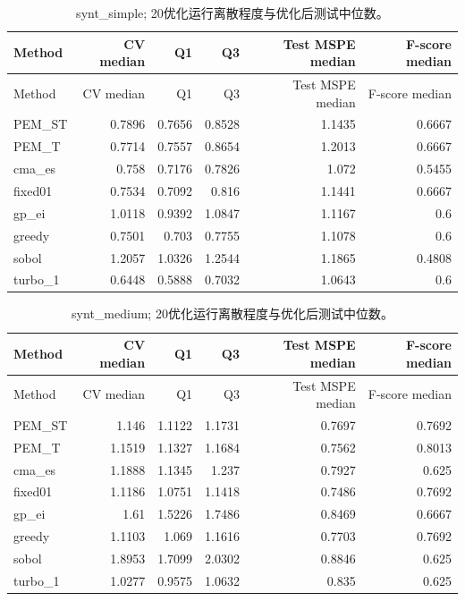 \documentclass[11pt,a4paper]{article}
\begin{document}
\par\noindent\begin{minipage}{\linewidth}

\begin{longtable}[]{@{}lrrrrr@{}}
\caption{synt\_simple;
20优化运行离散程度与优化后测试中位数。}\tabularnewline
\toprule
Method & CV median & Q1 & Q3 & Test MSPE median & F-score median \\
\midrule
\endfirsthead
\toprule
Method & CV median & Q1 & Q3 & Test MSPE median & F-score median \\
\midrule
\endhead
PEM\_ST & 0.7896 & 0.7656 & 0.8528 & 1.1435 & 0.6667 \\
PEM\_T & 0.7714 & 0.7557 & 0.8654 & 1.2013 & 0.6667 \\
cma\_es & 0.758 & 0.7176 & 0.7826 & 1.072 & 0.5455 \\
fixed01 & 0.7534 & 0.7092 & 0.816 & 1.1441 & 0.6667 \\
gp\_ei & 1.0118 & 0.9392 & 1.0847 & 1.1167 & 0.6 \\
greedy & 0.7501 & 0.703 & 0.7755 & 1.1078 & 0.6 \\
sobol & 1.2057 & 1.0326 & 1.2544 & 1.1865 & 0.4808 \\
turbo\_1 & 0.6448 & 0.5888 & 0.7032 & 1.0643 & 0.6 \\
\bottomrule
\end{longtable}

\end{minipage}\par

\par\noindent\begin{minipage}{\linewidth}

\begin{longtable}[]{@{}lrrrrr@{}}
\caption{synt\_medium;
20优化运行离散程度与优化后测试中位数。}\tabularnewline
\toprule
Method & CV median & Q1 & Q3 & Test MSPE median & F-score median \\
\midrule
\endfirsthead
\toprule
Method & CV median & Q1 & Q3 & Test MSPE median & F-score median \\
\midrule
\endhead
PEM\_ST & 1.146 & 1.1122 & 1.1731 & 0.7697 & 0.7692 \\
PEM\_T & 1.1519 & 1.1327 & 1.1684 & 0.7562 & 0.8013 \\
cma\_es & 1.1888 & 1.1345 & 1.237 & 0.7927 & 0.625 \\
fixed01 & 1.1186 & 1.0751 & 1.1418 & 0.7486 & 0.7692 \\
gp\_ei & 1.61 & 1.5226 & 1.7486 & 0.8469 & 0.6667 \\
greedy & 1.1103 & 1.069 & 1.1616 & 0.7703 & 0.7692 \\
sobol & 1.8953 & 1.7099 & 2.0302 & 0.8846 & 0.625 \\
turbo\_1 & 1.0277 & 0.9575 & 1.0632 & 0.835 & 0.625 \\
\bottomrule
\end{longtable}

\end{minipage}\par
\end{document}
